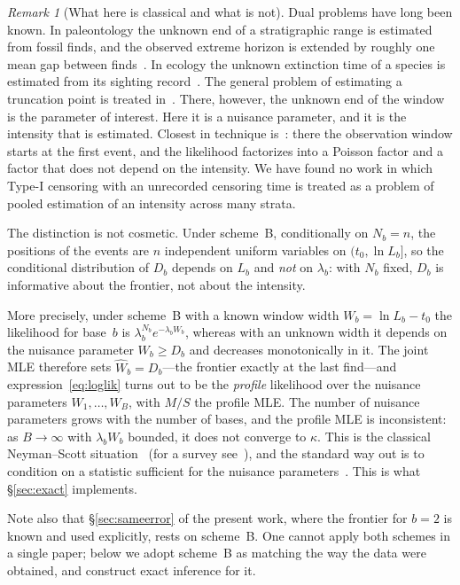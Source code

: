 \documentclass[11pt,a4paper]{article}
\theoremstyle{plain}
\theoremstyle{remark}
\newtheorem{remark}{Remark}
\begin{document}
\begin{remark}[What here is classical and what is not]
Dual problems have long been known. In paleontology the unknown end of a
stratigraphic range is estimated from fossil finds, and the observed extreme
horizon is extended by roughly one mean gap between
finds~\cite{straussSadler1989,marshall1990}. In ecology the unknown extinction
time of a species is estimated from its sighting record~\cite{solow1993}. The
general problem of estimating a truncation point is treated
in~\cite{robsonwhitlock1964}. There, however, the unknown end of the window is
the parameter of interest. Here it is a nuisance parameter, and it is the
intensity that is estimated. Closest in technique is~\cite{liu2023}: there the
observation window starts at the first event, and the likelihood factorizes into
a Poisson factor and a factor that does not depend on the intensity. We have
found no work in which Type-I censoring with an unrecorded censoring time is
treated as a problem of pooled estimation of an intensity across many strata.
\end{remark}

The distinction is not cosmetic. Under scheme~B, conditionally on $N_b=n$, the
positions of the events are $n$ independent uniform variables on
$(t_0,\ln L_b]$, so the conditional distribution of $D_b$ depends on $L_b$ and
\emph{not} on $\lambda_b$: with $N_b$ fixed, $D_b$ is informative about the
frontier, not about the intensity.

More precisely, under scheme~B with a known window width $W_b=\ln L_b-t_0$ the
likelihood for base~$b$ is $\lambda_b^{N_b}e^{-\lambda_bW_b}$, whereas with an
unknown width it depends on the nuisance parameter $W_b\ge D_b$ and decreases
monotonically in it. The joint MLE therefore sets $\hat W_b=D_b$---the frontier
exactly at the last find---and expression~\eqref{eq:loglik} turns out to be the
\emph{profile} likelihood over the nuisance parameters $W_1,\dots,W_B$, with
$M/S$ the profile MLE. The number of nuisance parameters grows with the number
of bases, and the profile MLE is inconsistent: as $B\to\infty$ with
$\lambda_bW_b$ bounded, it does not converge to $\kappa$. This is the classical
Neyman--Scott situation~\cite{neymanscott1948} (for a survey
see~\cite{lancaster2000}), and the standard way out is to condition on a
statistic sufficient for the nuisance
parameters~\cite{kalbfleischsprott1970,andersen1970}. This is what
\S\ref{sec:exact} implements.

Note also that \S\ref{sec:sameerror} of the present work, where the frontier for
$b=2$ is known and used explicitly, rests on scheme~B. One cannot apply both
schemes in a single paper; below we adopt scheme~B as matching the way the data
were obtained, and construct exact inference for it.
\end{document}
